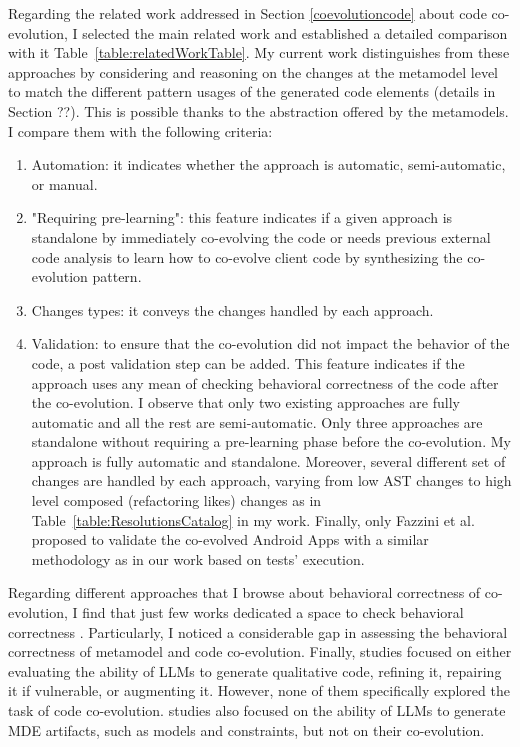   Regarding the related work addressed in Section \ref{coevolutioncode} about code co-evolution, I selected the main related work and established a detailed comparison with it Table~\ref{table:relatedWorkTable}. My current work distinguishes from these approaches by considering and reasoning on the changes at the metamodel level to match the different pattern usages of the generated code elements (details in Section ??). This is possible thanks to the abstraction offered by the metamodels. 
  I compare them with the following criteria: %
  
  \begin{enumerate}
  	
  	\item Automation: it indicates whether the approach is automatic, semi-automatic, or manual.
  	\item "Requiring pre-learning": 
  	this feature indicates if a given approach is standalone by immediately co-evolving the code or needs previous external code analysis to learn how to co-evolve client code by synthesizing the co-evolution pattern.
  	\item Changes types: it conveys the changes handled by each approach.
  	\item Validation: to ensure that the co-evolution did not impact the behavior of the code, a post validation step can be added. This feature indicates if the approach uses any mean of checking behavioral correctness of the code after the co-evolution.  I observe that only two existing approaches are fully automatic and all the rest are semi-automatic. Only three approaches are standalone without requiring a pre-learning phase before the co-evolution. My approach is fully automatic and standalone. Moreover, several different set of changes are handled by each approach, varying from low AST changes to high level composed (refactoring likes) changes as in Table~\ref{table:ResolutionsCatalog} in my work. Finally, only Fazzini et al.~\cite{10.1145/3387905.3388608} proposed to validate the co-evolved Android Apps with a similar methodology as in our work based on tests' execution. 
  \end{enumerate}
  
  Regarding different approaches that I browse about behavioral correctness of co-evolution, I find that just few works dedicated a space to check behavioral correctness \cite{correa2007refactoring, kusel2015systematic}. Particularly, I noticed a considerable gap in assessing the behavioral correctness of metamodel and code co-evolution.
  Finally, studies focused on either evaluating the ability of LLMs to generate qualitative code, refining it, repairing it if vulnerable, or augmenting it. However, none of them specifically explored the task of code co-evolution.
  studies also focused on the ability of LLMs to generate MDE artifacts, such as models and constraints, but not on their co-evolution. 
  
